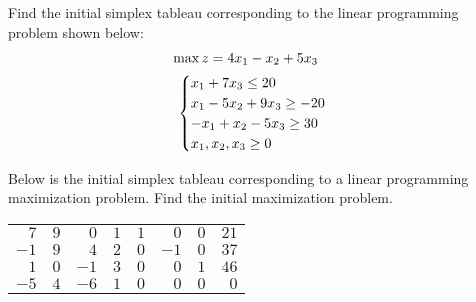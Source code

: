 \documentclass[11pt,letterpaper]{article}
\begin{document}

 Find the initial simplex tableau corresponding to the linear programming problem shown below:
	\[
	\begin{gathered}
	\hspace{-0.7cm} \max z= 4x_1 - x_2 + 5x_3 \\
	\begin{cases}
	x_1 + 7x_3 \leq 20 \\
	x_1 - 5x_2 + 9x_3 \geq -20 \\
	-x_1 + x_2 - 5x_3 \geq 30 \\
	x_1, x_2, x_3 \geq 0
	\end{cases}
	\end{gathered}
	\]



\newpage



 Below is the initial simplex tableau corresponding to a linear programming maximization problem. Find the initial maximization problem. \par
	\begin{table}[H]
	\centering
	\begin{tabular}{rrrrrrrr}
	$7$ & $9$ & $0$ & $1$ & $1$ & $0$ & $0$ & $21$ \\
	$-1$ & $9$ & $4$ & $2$ & $0$ & $-1$ & $0$ & $37$ \\
	$1$ & $0$ & $-1$ & $3$ & $0$ & $0$ & $1$ & $46$ \\
	$-5$ & $4$ & $-6$ & $1$ & $0$ & $0$ & $0$ & $0$ \\
	\end{tabular}
	\end{table}



\newpage
\end{document}
